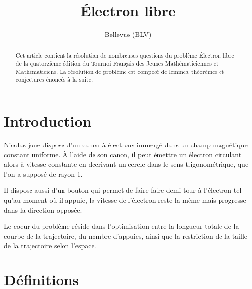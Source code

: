 \documentclass{amsart}
\theoremstyle{definition}
\theoremstyle{remark}
\numberwithin{equation}{section}
\begin{document}
\title{Électron libre}

\author{Bellevue (BLV)}

\begin{abstract}
    Cet article contient la résolution de nombreuses questions du problème \og Électron libre \fg{} de la quatorzième édition du Tournoi Français
    des Jeunes Mathématiciennes et Mathématiciens. La résolution de problème est composé de lemmes, théorèmes et conjectures énoncés à la suite.
\end{abstract}

\maketitle

\tableofcontents

\section{Introduction}

Nicolas joue dispose d’un canon à électrons immergé dans un champ magnétique constant uniforme. À l'aide de son canon, il peut émettre un électron 
circulant alors à vitesse constante en décrivant un cercle dans le sens trigonométrique, que l'on a supposé de rayon 1. 

Il dispose aussi d’un bouton qui permet de faire faire demi-tour à l’électron tel qu'au moment où il appuie, la vitesse de l’électron reste la même 
mais progresse dans la direction opposée.

Le coeur du problème réside dans l'optimisation entre la longueur totale de la courbe de la trajectoire, du nombre d'appuies, ainsi que la restriction 
de la taille de la trajectoire selon l'espace.\newpage
\section{Définitions}
\end{document}
